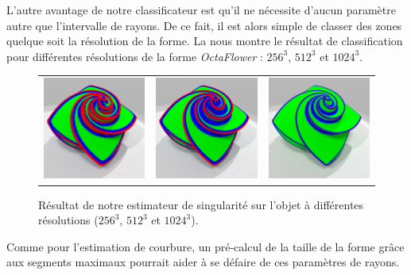 L'autre avantage de notre classificateur est qu'il ne nécessite d'aucun
paramètre autre que l'intervalle de rayons. De ce fait, il est alors simple de
classer des zones quelque soit la résolution de la forme. La
 nous montre le résultat de classification pour
différentes résolutions de la forme \emph{OctaFlower} : $256^3$, $512^3$ et
$1024^3$.

\begin{figure}[ht]
  \begin{center}
    \setlength{\tabcolsep}{1pt}
    \begin{tabular}{c c c}
      \includegraphics[width=4cm]{images/Feature/OctaFlower_256_II_scale} &
      \includegraphics[width=4cm]{images/Feature/OctaFlower_512_II_scale} &
      \includegraphics[width=4cm]{images/Feature/OctaFlower_1024_II_scale}
    \end{tabular}
    \caption{Résultat de notre estimateur de singularité sur l'objet \OctaFlower à différentes résolutions ($256^3$, $512^3$ et $1024^3$).\label{fig:feature-octa}}
  \end{center}
\end{figure}

Comme pour l'estimation de courbure, un pré-calcul de la taille de la forme
grâce aux segments maximaux pourrait aider à se défaire de ces paramètres de
rayons.
%
